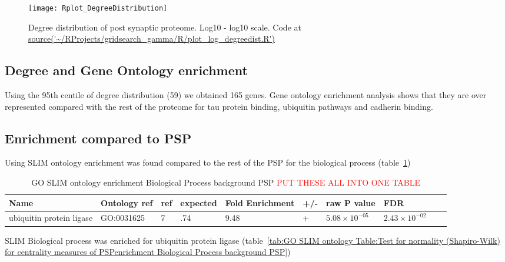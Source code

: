 \begin{figure}
    \texttt{[image: Rplot\_DegreeDistribution]}
    \caption{Degree distribution of post synaptic proteome. Log10 - log10 scale. Code at \url{source('~/RProjects/gridsearch_gamma/R/plot_log_degreedist.R') }}
    \label{fig:Degree distribution of post synaptic proteome. Log10 - log10 scale.}
\end{figure}

\subsection{Degree and Gene Ontology enrichment}

Using the 95th centile of degree distribution (59) we obtained 165 genes. Gene ontology enrichment analysis shows that they are over represented compared with the rest of the proteome for tau protein binding, ubiquitin pathways and cadherin binding.

\subsection{Enrichment compared to PSP}

Using SLIM ontology enrichment was found compared to the rest of the PSP for the biological process (table~\ref{tab:GO SLIM ontology enrichment Biological Process background PSP})

\begin{table}
\centering
\begin{adjustbox}{max width=\textwidth}
\begin{tabular}{llllllllll}
Name & Ontology ref &ref &	expected &	Fold Enrichment &	+/-	&raw P value&FDR\\
\hline
ubiquitin protein ligase & GO:0031625&  	7 &  	.74 & 	9.48 &  	+ & 	$5.08\times 10^{-05}$ & 	$2.43 \times 10^{-02}$\\
\end{tabular}
\end{adjustbox}
\caption{GO SLIM ontology enrichment Biological Process background PSP \textcolor{red}{PUT THESE ALL INTO ONE TABLE}}
\label{tab:GO SLIM ontology enrichment Biological Process background PSP}
\end{table}



SLIM Biological process was enriched for ubiquitin protein ligase (table~\ref{tab:GO SLIM ontology Table:Test for normality (Shapiro-Wilk) for centrality measures of PSPenrichment Biological Process background PSP})%






